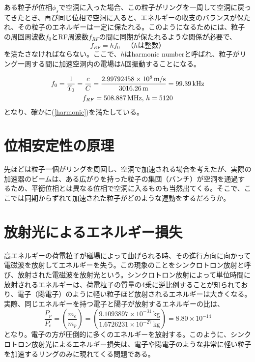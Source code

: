 \documentclass[10pt,a4paper]{ltjsarticle}
\begin{document}
ある粒子が位相$\phi_s$で空洞に入った場合、この粒子がリングを一周して空洞に戻ってきたとき、再び同じ位相で空洞に入ると、エネルギーの収支のバランスが保たれ、その粒子のエネルギーは一定に保たれる。このようになるためには、粒子の周回周波数$f_0$とRF周波数$f_{RF}$の間に同期が保たれるような関係が必要で、
%
\begin{equation}
  f_{RF}=h f_0 \quad（hは整数）
  \label{harmonic}
\end{equation}
%
を満たさなければならない。ここで、$h$はharmonic numberと呼ばれ、粒子がリング一周する間に加速空洞内の電場は$h$回振動することになる。

\begin{tcolorbox}[title=\textgt{KEKBにおける$f_0$, $f_{RF}$, $h$}の関係]
%
\begin{gather}
  f_0 = \frac{1}{T_0}=\frac{c}{C}=\frac{2.99792458\times 10^8\,\mathrm{m/s}}{3016.26\,\mathrm{m}}=99.39\,\mathrm{kHz} \notag \\
  f_{RF}=508.887\,\mathrm{MHz},\,h=5120 \notag
\end{gather}
%
となり、確かに(\ref{harmonic})を満たしている。
\end{tcolorbox}

\section{位相安定性の原理}
先ほどは粒子一個がリングを周回し、空洞で加速される場合を考えたが、実際の加速器のビームは、ある広がりを持った粒子の集団（バンチ）が空洞を通過するため、平衡位相とは異なる位相で空洞に入るものも当然出てくる。そこで、ここでは同期からずれて加速された粒子がどのような運動をするだろうか。

\section{放射光によるエネルギー損失}
高エネルギーの荷電粒子が磁場によって曲げられる時、その進行方向に向かって電磁波を放射してエネルギーを失う。この現象のことをシンクロトロン放射と呼び、放射された電磁波を放射光という。シンクロトロン放射によって単位時間に放射されるエネルギーは、荷電粒子の質量の4乗に逆比例することが知られており、電子（陽電子）のように軽い粒子ほど放射されるエネルギーは大きくなる。実際、同じエネルギーを持つ電子と陽子が放射するエネルギーの比は、
%
\begin{equation}
  \frac{P_{p}}{P_{e}} = \left(\frac{m_e}{m_p}\right)=\left(\frac{9.1093897\times 10^{-31}\,\mathrm{kg}}{1.6726231\times 10^{-27}\,\mathrm{kg}}\right)=8.80\times 10^{-14}
  \label{eq4}
\end{equation}
%
となり。電子の方が圧倒的に多くのエネルギーを放射する。このように、シンクロトロン放射光によるエネルギー損失は、電子や陽電子のような非常に軽い粒子を加速するリングのみに現れてくる問題である。
\end{document}

